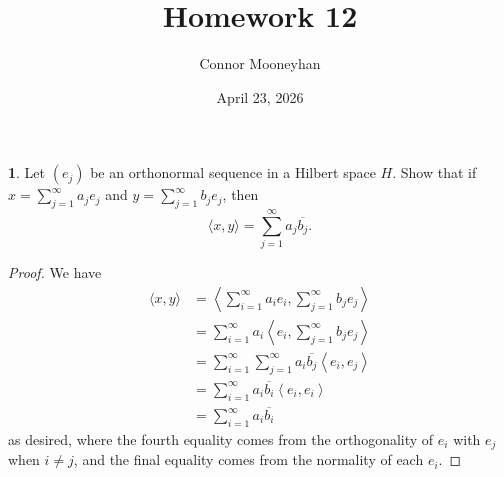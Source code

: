 \documentclass[12pt]{article}
\title{Homework 12}
\author{Connor Mooneyhan}
\date{April 23, 2026}
\theoremstyle{definition}
\newtheorem{ex}{}
\begin{document}
\maketitle

\begin{ex}
	Let $(e_j)$ be an orthonormal sequence in a Hilbert space $H$.
	Show that if $x = \sum_{j=1}^\infty a_je_j$ and $y = \sum_{j=1}^\infty b_je_j$, then \begin{equation*}
		\langle x, y \rangle = \sum_{j=1}^\infty a_j\overline{b_j}.
	\end{equation*}
\end{ex}
\begin{proof}
	We have \begin{align*}
		\langle x, y \rangle & = \left\langle \sum_{i=1}^\infty a_ie_i, \sum_{j=1}^\infty b_je_j \right\rangle             \\
		                     & = \sum_{i=1}^\infty a_i \left\langle e_i, \sum_{j=1}^\infty b_je_j \right\rangle            \\
		                     & = \sum_{i=1}^\infty \sum_{j=1}^\infty a_i\overline{b_j} \left\langle e_i, e_j \right\rangle \\
		                     & = \sum_{i=1}^\infty a_i\overline{b_i} \left\langle e_i, e_i \right\rangle                   \\
		                     & = \sum_{i=1}^\infty a_i\overline{b_i}
	\end{align*}
	as desired, where the fourth equality comes from the orthogonality of $e_i$ with $e_j$ when $i \neq j$, and the final equality comes from the normality of each $e_i$.
\end{proof}
\end{document}
